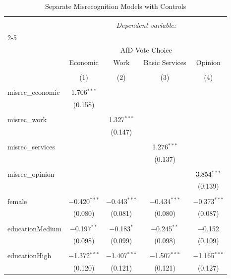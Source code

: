 
\begin{table}[!htbp] \centering 
  \caption{Separate Misrecognition Models with Controls} 
  \label{tab:separate_models_controls} 
\begin{tabular}{@{\extracolsep{5pt}}lcccc} 
\\[-1.8ex]\hline 
\hline \\[-1.8ex] 
 & \multicolumn{4}{c}{\textit{Dependent variable:}} \\ 
\cline{2-5} 
\\[-1.8ex] & \multicolumn{4}{c}{AfD Vote Choice} \\ 
 & Economic & Work & Basic Services & Opinion \\ 
\\[-1.8ex] & (1) & (2) & (3) & (4)\\ 
\hline \\[-1.8ex] 
 misrec\_economic & 1.706$^{***}$ &  &  &  \\ 
  & (0.158) &  &  &  \\ 
  & & & & \\ 
 misrec\_work &  & 1.327$^{***}$ &  &  \\ 
  &  & (0.147) &  &  \\ 
  & & & & \\ 
 misrec\_services &  &  & 1.276$^{***}$ &  \\ 
  &  &  & (0.137) &  \\ 
  & & & & \\ 
 misrec\_opinion &  &  &  & 3.854$^{***}$ \\ 
  &  &  &  & (0.139) \\ 
  & & & & \\ 
 female & $-$0.420$^{***}$ & $-$0.443$^{***}$ & $-$0.434$^{***}$ & $-$0.373$^{***}$ \\ 
  & (0.080) & (0.081) & (0.080) & (0.087) \\ 
  & & & & \\ 
 educationMedium & $-$0.197$^{**}$ & $-$0.183$^{*}$ & $-$0.245$^{**}$ & $-$0.152 \\ 
  & (0.098) & (0.099) & (0.098) & (0.109) \\ 
  & & & & \\ 
 educationHigh & $-$1.372$^{***}$ & $-$1.407$^{***}$ & $-$1.507$^{***}$ & $-$1.165$^{***}$ \\ 
  & (0.120) & (0.121) & (0.121) & (0.127) \\ 

\end{tabular}
\end{table}
